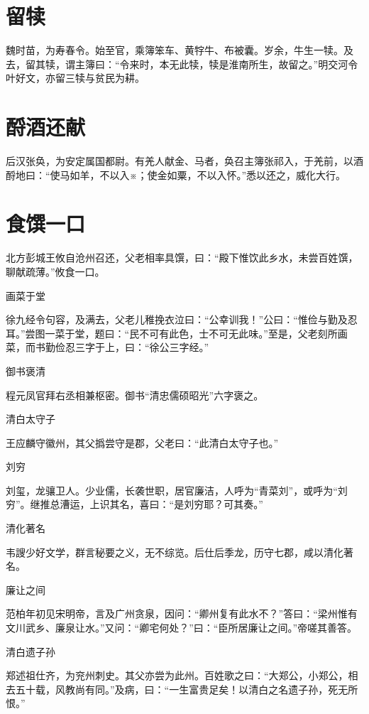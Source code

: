 \documentclass[a4paper,12pt,UTF8,twoside]{ctexbook}
\begin{document}
    \section{留犊}
    
    魏时苗，为寿春令。始至官，乘簿笨车、黄牸牛、布被囊。岁余，牛生一犊。及去，留其犊，谓主簿曰：“令来时，本无此犊，犊是淮南所生，故留之。”明交河令叶好文，亦留三犊与贫民为耕。
    
    \section{酹酒还献}
    
    后汉张奂，为安定属国都尉。有羌人献金、马者，奂召主簿张祁入，于羌前，以酒酹地曰：“使马如羊，不以入※；使金如粟，不以入怀。”悉以还之，威化大行。
    
    \section{食馔一口}
    
    北方彭城王攸自沧州召还，父老相率具馔，曰：“殿下惟饮此乡水，未尝百姓馔，聊献疏薄。”攸食一口。
    
    画菜于堂
    
    徐九经令句容，及满去，父老儿稚挽衣泣曰：“公幸训我！”公曰：“惟俭与勤及忍耳。”尝图一菜于堂，题曰：“民不可有此色，士不可无此味。”至是，父老刻所画菜，而书勤俭忍三字于上，曰：“徐公三字经。”
    
    御书褒清
    
    程元凤官拜右丞相兼枢密。御书“清忠儒硕昭光”六字褒之。
    
    清白太守子
    
    王应麟守徽州，其父撝尝守是郡，父老曰：“此清白太守子也。”
    
    刘穷
    
    刘玺，龙骧卫人。少业儒，长袭世职，居官廉洁，人呼为“青菜刘”，或呼为“刘穷”。继推总漕运，上识其名，喜曰：“是刘穷耶？可其奏。”
    
    清化著名
    
    韦謏少好文学，群言秘要之义，无不综览。后仕后季龙，历守七郡，咸以清化著名。
    
    廉让之间
    
    范柏年初见宋明帝，言及广州贪泉，因问：“卿州复有此水不？”答曰：“梁州惟有文川武乡、廉泉让水。”又问：“卿宅何处？”曰：“臣所居廉让之间。”帝嗟其善答。
    
    清白遗子孙
    
    郑述祖仕齐，为兖州刺史。其父亦尝为此州。百姓歌之曰：“大郑公，小郑公，相去五十载，风教尚有同。”及病，曰：“一生富贵足矣！以清白之名遗子孙，死无所恨。”
    
\end{document}
